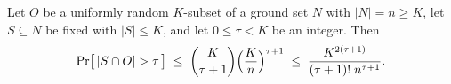 %
%
%


\begin{lemma}\label{lem:n5-conc}
Let $O$ be a uniformly random $K$-subset of a ground set $N$ with $|N|=n\ge K$,
let $S\subseteq N$ be fixed with $|S|\le K$, and let $0\le\tau<K$ be an integer.
Then
\[
  \Pr\bigl[\,|S\cap O|>\tau\,\bigr]\;\le\;\binom{K}{\tau+1}\Bigl(\frac{K}{n}\Bigr)^{\tau+1}
  \;\le\;\frac{K^{2(\tau+1)}}{(\tau+1)!\;n^{\tau+1}} .
\]
\end{lemma}


